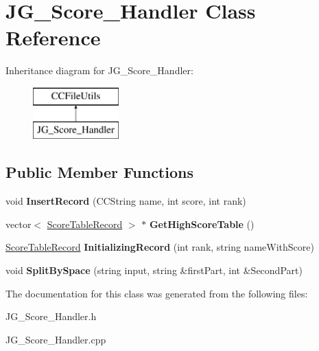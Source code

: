 \hypertarget{class_j_g___score___handler}{\section{J\-G\-\_\-\-Score\-\_\-\-Handler Class Reference}
\label{class_j_g___score___handler}
}
Inheritance diagram for J\-G\-\_\-\-Score\-\_\-\-Handler\-:\begin{figure}[H]
\begin{center}
\leavevmode
\includegraphics[height=2.000000cm]{class_j_g___score___handler}
\end{center}
\end{figure}
\subsection*{Public Member Functions}
\begin{DoxyCompactItemize}
\item 
\hypertarget{class_j_g___score___handler_aa6036815a089006d0f9885af28797a3a}{void {\bfseries Insert\-Record} (C\-C\-String name, int score, int rank)}\label{class_j_g___score___handler_aa6036815a089006d0f9885af28797a3a}

\item 
\hypertarget{class_j_g___score___handler_a289c33c8e670c2e2b937786d19783078}{vector$<$ \hyperlink{struct_score_table_record}{Score\-Table\-Record} $>$ $\ast$ {\bfseries Get\-High\-Score\-Table} ()}\label{class_j_g___score___handler_a289c33c8e670c2e2b937786d19783078}

\item 
\hypertarget{class_j_g___score___handler_aca1fac35b9e6062738e3d8907f02948e}{\hyperlink{struct_score_table_record}{Score\-Table\-Record} {\bfseries Initializing\-Record} (int rank, string name\-With\-Score)}\label{class_j_g___score___handler_aca1fac35b9e6062738e3d8907f02948e}

\item 
\hypertarget{class_j_g___score___handler_a598968fc031b35762cd3e20b549eb84e}{void {\bfseries Split\-By\-Space} (string input, string \&first\-Part, int \&Second\-Part)}\label{class_j_g___score___handler_a598968fc031b35762cd3e20b549eb84e}

\end{DoxyCompactItemize}


The documentation for this class was generated from the following files\-:\begin{DoxyCompactItemize}
\item 
J\-G\-\_\-\-Score\-\_\-\-Handler.\-h\item 
J\-G\-\_\-\-Score\-\_\-\-Handler.\-cpp\end{DoxyCompactItemize}
